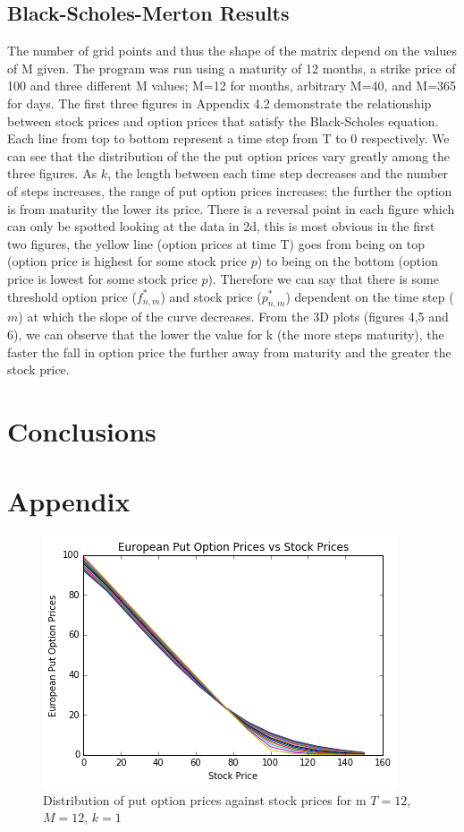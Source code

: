 \documentclass[paper=a4, fontsize=10pt]{scrartcl} %
\begin{document}
\subsection{Black-Scholes-Merton Results}

The number of grid points and thus the shape of the matrix depend on the values of M given. The program was run using a maturity of 12 months, a strike price of 100 and three different M values; M=12 for months, arbitrary M=40, and M=365 for days. The first three figures in Appendix 4.2 demonstrate the relationship between stock prices and option prices that satisfy the Black-Scholes equation. Each line from top to bottom represent a time step from T to 0 respectively. We can see that the distribution of the the put option prices vary greatly among the three figures. As $k$, the length between each time step decreases and the number of steps increases, the range of put option prices increases; the further the option is from maturity the lower its price. There is a reversal point in each figure which can only be spotted looking at the data in 2d, this is most obvious in the first two figures, the yellow line (option prices at time T) goes from being on top (option price is highest for some stock price $p$) to being on the bottom (option price is lowest for some stock price $p$). Therefore we can say that there is some threshold option price ($f^{*}_{n,m}$) and stock price ($p^{*}_{n,m}$) dependent on the time step ($m$) at which the slope of the curve decreases. From the 3D plots (figures 4,5 and 6), we can observe that the lower the value for k (the more steps maturity), the faster the fall in option price the further away from maturity and the greater the stock price.


\clearpage
\section{Conclusions}
\clearpage
\section*{Appendix}

\begin{figure}[h!]
\center
\includegraphics[scale=0.8]{vary1212.png}
\caption{Distribution of put option prices against stock prices for m $T=12$, $M=12$, $k=1$}
\end{figure}
\end{document}
